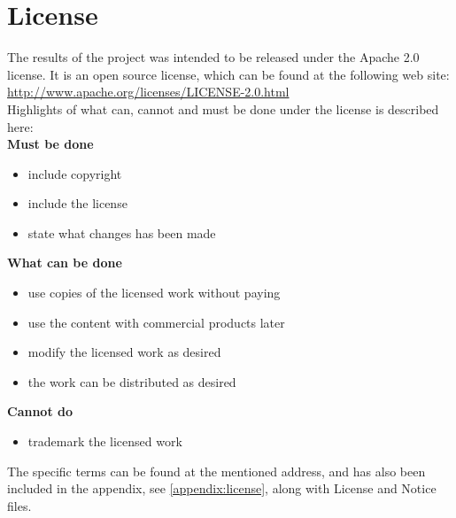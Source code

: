 \section{License}
The results of the project was intended to be released under the Apache 2.0 license. It is an open source license, which can be found  at the following web site: \url{http://www.apache.org/licenses/LICENSE-2.0.html}\\
Highlights of what can, cannot and must be done under the license is described here:\\
\textbf{Must be done}
\begin{itemize}
\item include copyright
\item include the license
\item state what changes has been made
\end{itemize}
\textbf{What can be done}
\begin{itemize}
\item use copies of the licensed work without paying
\item use the content with commercial products later
\item modify the licensed work as desired
\item the work can be distributed as desired
\end{itemize}
\textbf{Cannot do}
\begin{itemize}
\item trademark the licensed work
\end{itemize}
The specific terms can be found at the mentioned address, and has also been included in the appendix, see \ref{appendix:license}, along with License and Notice files.
